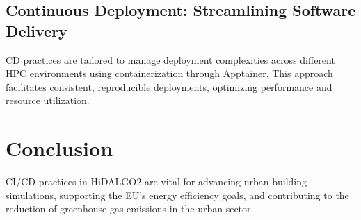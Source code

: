 \documentclass[runningheads]{llncs}
\begin{document}
\subsection{Continuous Deployment: Streamlining Software Delivery}
CD practices are tailored to manage deployment complexities across different HPC environments using containerization through Apptainer. This approach facilitates consistent, reproducible deployments, optimizing performance and resource utilization.

\section{Conclusion}
CI/CD practices in HiDALGO2 are vital for advancing urban building simulations, supporting the EU's energy efficiency goals, and contributing to the reduction of greenhouse gas emissions in the urban sector.



\end{document}
